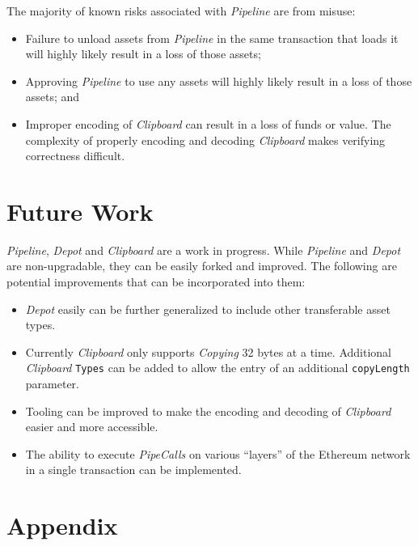 \documentclass[tikz]{article}
\newcommand{\code}[1]{\texttt{#1}}
\newcommand{\term}[1]{\textsl{#1}}
\begin{document}
The majority of known risks associated with \term{Pipeline} are from misuse:

\begin{itemize}
    \item Failure to unload assets from \term{Pipeline} in the same transaction that loads it will highly likely result in a loss of those assets;
    \item Approving \term{Pipeline} to use any assets will highly likely result in a loss of those assets; and
    \item Improper encoding of \term{Clipboard} can result in a loss of funds or value. The complexity of properly encoding and decoding \term{Clipboard} makes verifying correctness difficult. 
\end{itemize}

\section{Future Work}
\term{Pipeline}, \term{Depot} and \term{Clipboard} are a work in progress. While \term{Pipeline} and \term{Depot} are non-upgradable, they can be easily forked and improved. The following are potential improvements that can be incorporated into them:

\begin{itemize}
    \item \term{Depot} easily can be further generalized to include other transferable asset types.
    \item Currently \term{Clipboard} only supports \term{Copying} 32 bytes at a time. Additional \term{Clipboard} \code{Types} can be added to allow the entry of an additional \code{copyLength} parameter.
    \item Tooling can be improved to make the encoding and decoding of \term{Clipboard} easier and more accessible.
    \item The ability to execute \term{PipeCalls} on various “layers” of the Ethereum network in a single transaction can be implemented.
\end{itemize}

\newpage
\section{Appendix}

\newpage
\end{document}

